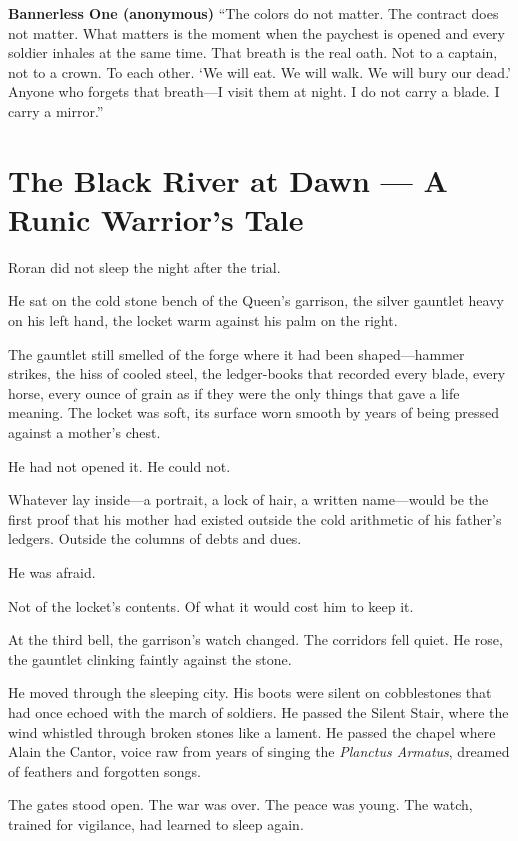 \documentclass[9pt,a5paper]{extbook}
\begin{document}
\vspace{0.3cm}
\noindent\textbf{Bannerless One (anonymous)}
``The colors do not matter. The contract does not matter. What matters is the moment when the paychest is opened and every soldier inhales at the same time. That breath is the real oath. Not to a captain, not to a crown. To each other. `We will eat. We will walk. We will bury our dead.' Anyone who forgets that breath---I visit them at night. I do not carry a blade. I carry a mirror.''

\clearpage

\appendix
\chapter{The Black River at Dawn --- A Runic Warrior's Tale}

\noindent
Roran did not sleep the night after the trial.

He sat on the cold stone bench of the Queen's garrison, the silver gauntlet heavy on his left hand, the locket warm against his palm on the right.

The gauntlet still smelled of the forge where it had been shaped---hammer strikes, the hiss of cooled steel, the ledger-books that recorded every blade, every horse, every ounce of grain as if they were the only things that gave a life meaning. The locket was soft, its surface worn smooth by years of being pressed against a mother's chest.

He had not opened it. He could not.

Whatever lay inside---a portrait, a lock of hair, a written name---would be the first proof that his mother had existed outside the cold arithmetic of his father's ledgers. Outside the columns of debts and dues.

He was afraid.

Not of the locket's contents. Of what it would cost him to keep it.

At the third bell, the garrison's watch changed. The corridors fell quiet. He rose, the gauntlet clinking faintly against the stone.

He moved through the sleeping city. His boots were silent on cobblestones that had once echoed with the march of soldiers. He passed the Silent Stair, where the wind whistled through broken stones like a lament. He passed the chapel where Alain the Cantor, voice raw from years of singing the \textit{Planctus Armatus}, dreamed of feathers and forgotten songs.

The gates stood open. The war was over. The peace was young. The watch, trained for vigilance, had learned to sleep again.
\end{document}
